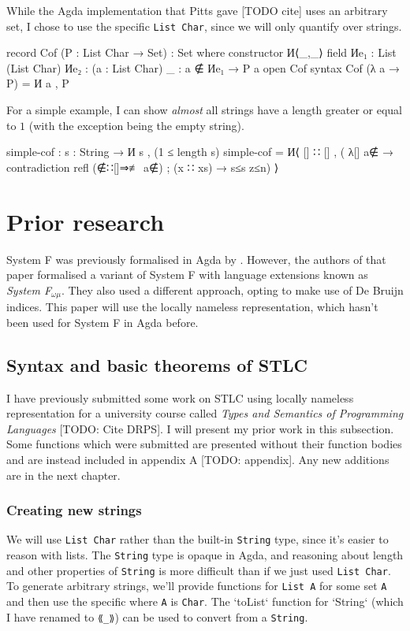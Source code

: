 \documentclass[logo,bsc,singlespacing,parskip,online]{infthesis}
\renewenvironment{code}{\mintedcopy[breaklines]{agda}}{\endmintedcopy}
\begin{document}
While the Agda implementation that Pitts gave [TODO cite] uses an arbitrary set, I chose to use the
specific \texttt{List Char}, since we will only quantify over strings.

\begin{code}
record Cof (P : List Char → Set) : Set where
  constructor И⟨_,_⟩
  field
    Иe₁ : List (List Char)
    Иe₂ : (a : List Char) {_ : a ∉ Иe₁} → P a
open Cof
syntax Cof (λ a → P) = И a , P
\end{code}

For a simple example, I can show \textit{almost} all strings have a length greater or equal to $1$
(with the exception being the empty string).

\begin{code}
simple-cof : {s : String} → И s , (1 ≤ length s)
simple-cof = И⟨ [] ∷ [] , (
  λ{[] {a∉}  → contradiction refl (∉∷[]⇒≢ a∉)
  ; (x ∷ xs) → s≤s z≤n}) ⟩
\end{code}

\section{Prior research}
System F was previously formalised in Agda by \citet{hutton_system_2019}. However, the authors of that paper formalised a
variant of System F with language extensions known as \textit{System F$_{\omega \mu}$}. They also
used a different approach, opting to make use of De Bruijn indices. This paper will use the locally
nameless representation, which hasn't been used for System F in Agda before.

\subsection{Syntax and basic theorems of STLC}
I have previously submitted some work on STLC using locally nameless representation for a university
course called \textit{Types and Semantics of Programming Languages} [TODO: Cite DRPS]. I will
present my prior work in this subsection. Some functions which were submitted are presented without their
function bodies and are instead included in appendix A [TODO: appendix]. Any new additions are in
the next chapter.

\subsubsection{Creating new strings}
We will use \texttt{List Char} rather than the built-in \texttt{String} type, since it's easier to
reason with lists. The \texttt{String} type is opaque in Agda, and reasoning about length and other
properties of \texttt{String} is more difficult than if we just used \texttt{List Char}. To generate
arbitrary strings, we'll provide functions for \texttt{List A} for some set \texttt{A} and then use
the specific where \texttt{A} is \texttt{Char}. The `toList` function for `String` (which I have
renamed to \texttt{⟪\_⟫}) can be used to convert from a \texttt{String}.
\end{document}
